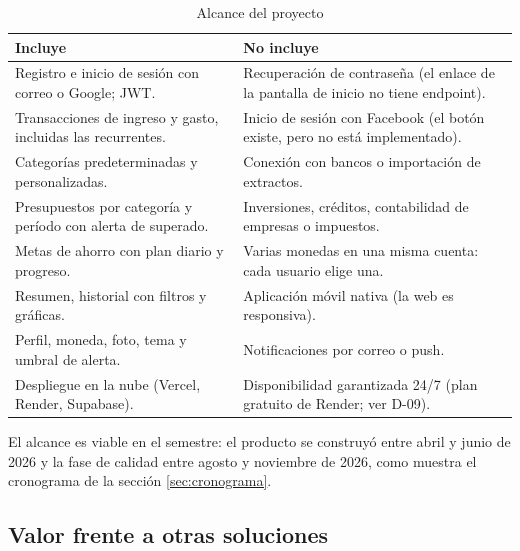 \begin{table}[H]
\caption{Alcance del proyecto}
\label{tab:alcance}
\begin{tabularx}{\linewidth}{Y Y}
\toprule
Incluye & No incluye \\
\midrule
Registro e inicio de sesión con correo o Google; JWT. & Recuperación de contraseña (el enlace de la pantalla de inicio no tiene endpoint). \\
Transacciones de ingreso y gasto, incluidas las recurrentes. & Inicio de sesión con Facebook (el botón existe, pero no está implementado). \\
Categorías predeterminadas y personalizadas. & Conexión con bancos o importación de extractos. \\
Presupuestos por categoría y período con alerta de superado. & Inversiones, créditos, contabilidad de empresas o impuestos. \\
Metas de ahorro con plan diario y progreso. & Varias monedas en una misma cuenta: cada usuario elige una. \\
Resumen, historial con filtros y gráficas. & Aplicación móvil nativa (la web es responsiva). \\
Perfil, moneda, foto, tema y umbral de alerta. & Notificaciones por correo o push. \\
Despliegue en la nube (Vercel, Render, Supabase). & Disponibilidad garantizada 24/7 (plan gratuito de Render; ver D-09). \\
\bottomrule
\end{tabularx}
\end{table}

El alcance es viable en el semestre: el producto se construyó entre abril y junio de 2026 y la fase de calidad entre agosto y noviembre de 2026, como muestra el cronograma de la sección \ref{sec:cronograma}.

\subsection{Valor frente a otras soluciones}

